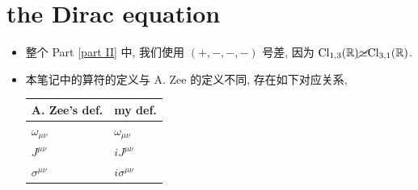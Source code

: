 \chapter{the Dirac equation}
\begin{itemize}
	\item 整个 Part \ref{part II} 中, 我们使用 $(+, -, -, -)$ 号差, 因为 $\mathrm{Cl}_{1, 3}(\mathbb{R}) \cancel{\simeq} \mathrm{Cl}_{3, 1}(\mathbb{R})$.
	
	\item 本笔记中的算符的定义与 A. Zee 的定义不同, 存在如下对应关系,
	
	\begin{center}
		\begin{tabularx}{\linewidth}{KK}
			\toprule 
			A. Zee's def. & my def. \\
			\midrule 
			$\omega_{\mu \nu}$ & $\omega_{\mu \nu}$ \\
			$J^{\mu \nu}$ & $i J^{\mu \nu}$ \\
			$\sigma^{\mu \nu}$ & $i \sigma^{\mu \nu}$ \\
			\bottomrule
		\end{tabularx}
	\end{center}
\end{itemize}

